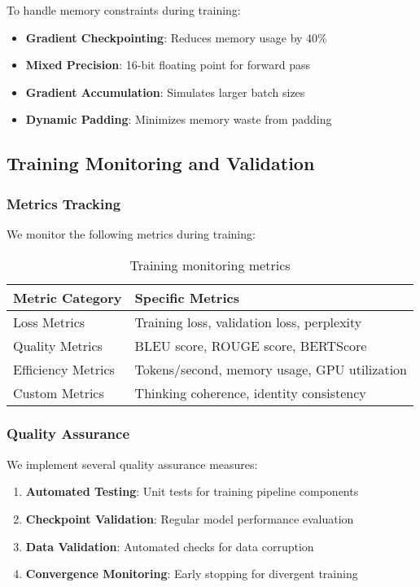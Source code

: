 To handle memory constraints during training:

\begin{itemize}
    \item \textbf{Gradient Checkpointing}: Reduces memory usage by 40\%
    \item \textbf{Mixed Precision}: 16-bit floating point for forward pass
    \item \textbf{Gradient Accumulation}: Simulates larger batch sizes
    \item \textbf{Dynamic Padding}: Minimizes memory waste from padding
\end{itemize}

\subsection{Training Monitoring and Validation}

\subsubsection{Metrics Tracking}

We monitor the following metrics during training:

\begin{table}[H]
\centering
\begin{tabular}{ll}
\toprule
Metric Category & Specific Metrics \\
\midrule
Loss Metrics & Training loss, validation loss, perplexity \\
Quality Metrics & BLEU score, ROUGE score, BERTScore \\
Efficiency Metrics & Tokens/second, memory usage, GPU utilization \\
Custom Metrics & Thinking coherence, identity consistency \\
\bottomrule
\end{tabular}
\caption{Training monitoring metrics}
\label{tab:metrics}
\end{table}

\subsubsection{Quality Assurance}

We implement several quality assurance measures:

\begin{enumerate}
    \item \textbf{Automated Testing}: Unit tests for training pipeline components
    \item \textbf{Checkpoint Validation}: Regular model performance evaluation
    \item \textbf{Data Validation}: Automated checks for data corruption
    \item \textbf{Convergence Monitoring}: Early stopping for divergent training
\end{enumerate}


